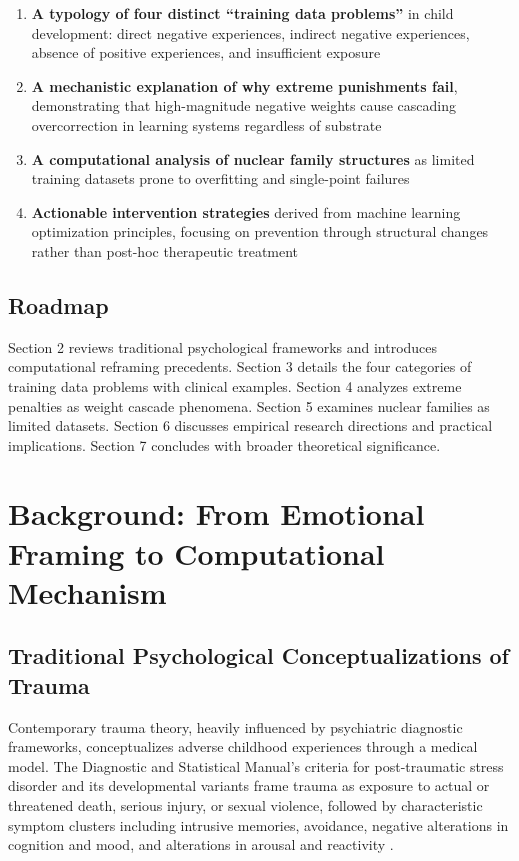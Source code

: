 \documentclass{article}
\begin{document}
\begin{enumerate}
\item \textbf{A typology of four distinct ``training data problems''} in child development: direct negative experiences, indirect negative experiences, absence of positive experiences, and insufficient exposure

\item \textbf{A mechanistic explanation of why extreme punishments fail}, demonstrating that high-magnitude negative weights cause cascading overcorrection in learning systems regardless of substrate

\item \textbf{A computational analysis of nuclear family structures} as limited training datasets prone to overfitting and single-point failures

\item \textbf{Actionable intervention strategies} derived from machine learning optimization principles, focusing on prevention through structural changes rather than post-hoc therapeutic treatment
\end{enumerate}

\subsection{Roadmap}

Section 2 reviews traditional psychological frameworks and introduces computational reframing precedents. Section 3 details the four categories of training data problems with clinical examples. Section 4 analyzes extreme penalties as weight cascade phenomena. Section 5 examines nuclear families as limited datasets. Section 6 discusses empirical research directions and practical implications. Section 7 concludes with broader theoretical significance.

\section{Background: From Emotional Framing to Computational Mechanism}

\subsection{Traditional Psychological Conceptualizations of Trauma}

Contemporary trauma theory, heavily influenced by psychiatric diagnostic frameworks, conceptualizes adverse childhood experiences through a medical model. The Diagnostic and Statistical Manual's criteria for post-traumatic stress disorder and its developmental variants frame trauma as exposure to actual or threatened death, serious injury, or sexual violence, followed by characteristic symptom clusters including intrusive memories, avoidance, negative alterations in cognition and mood, and alterations in arousal and reactivity \cite{apa2013}.
\end{document}
